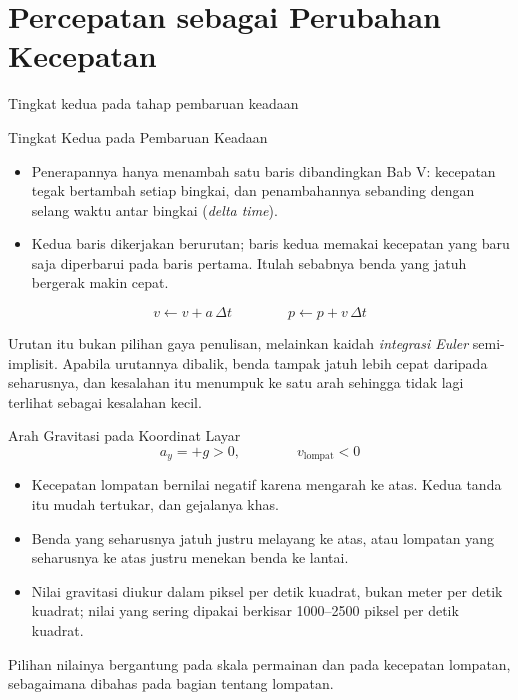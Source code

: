 \documentclass[aspectratio=169,10pt]{beamer}
\begin{document}
\section{Percepatan sebagai Perubahan Kecepatan}
  {Tingkat kedua pada tahap pembaruan keadaan}

\begin{frame}{Tingkat Kedua pada Pembaruan Keadaan}
\begin{itemize}
  \item Penerapannya hanya menambah satu baris dibandingkan Bab V: kecepatan
        tegak bertambah setiap bingkai, dan penambahannya sebanding dengan
        selang waktu antar bingkai (\emph{delta time}).
  \item Kedua baris dikerjakan berurutan; baris kedua memakai kecepatan yang
        baru saja diperbarui pada baris pertama. Itulah sebabnya benda yang
        jatuh bergerak makin cepat.
\end{itemize}
\[
  v \leftarrow v + a\,\Delta t
  \qquad\qquad
  p \leftarrow p + v\,\Delta t
\]
\begin{kotak}
Urutan itu bukan pilihan gaya penulisan, melainkan kaidah \emph{integrasi
Euler} semi-implisit. Apabila urutannya dibalik, benda tampak jatuh lebih cepat
daripada seharusnya, dan kesalahan itu menumpuk ke satu arah sehingga tidak
lagi terlihat sebagai kesalahan kecil.
\end{kotak}
\end{frame}

\begin{frame}{Arah Gravitasi pada Koordinat Layar}
\[
  a_y = +g > 0, \qquad\qquad v_{\text{lompat}} < 0
\]
\begin{itemize}
  \item Kecepatan lompatan bernilai negatif karena mengarah ke atas. Kedua
        tanda itu mudah tertukar, dan gejalanya khas.
  \item Benda yang seharusnya jatuh justru melayang ke atas, atau lompatan yang
        seharusnya ke atas justru menekan benda ke lantai.
  \item Nilai gravitasi diukur dalam piksel per detik kuadrat, bukan meter per
        detik kuadrat; nilai yang sering dipakai berkisar 1000--2500 piksel per
        detik kuadrat.
\end{itemize}
\begin{kotak}
Pilihan nilainya bergantung pada skala permainan dan pada kecepatan lompatan,
sebagaimana dibahas pada bagian tentang lompatan.
\end{kotak}
\end{frame}
\end{document}
